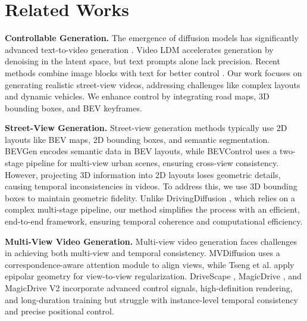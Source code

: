 \section{Related Works}
\label{sec:related}

\noindent \textbf{Controllable Generation.}  
The emergence of diffusion models \cite{zhang2024moonshot} has significantly advanced text-to-video generation \cite{an2023latent, blattmann2023align, guo2023animatediff, he2022latent, ho2022imagen, svd, singer2022make, wang2023videofactory, zhou2023magicvideo, cogvideox, guo2024infinitydrive}. Video LDM \cite{blattmann2023align} accelerates generation by denoising in the latent space, but text prompts alone lack precision. Recent methods combine image blocks with text for better control \cite{zhang2024moonshot}. Our work focuses on generating realistic street-view videos, addressing challenges like complex layouts and dynamic vehicles. We enhance control by integrating road maps, 3D bounding boxes, and BEV keyframes.

\noindent \textbf{Street-View Generation.}  
Street-view generation methods typically use 2D layouts like BEV maps, 2D bounding boxes, and semantic segmentation. BEVGen \cite{swerdlow2023street} encodes semantic data in BEV layouts, while BEVControl \cite{bevcontrol} uses a two-stage pipeline for multi-view urban scenes, ensuring cross-view consistency. However, projecting 3D information into 2D layouts loses geometric details, causing temporal inconsistencies in videos. To address this, we use 3D bounding boxes to maintain geometric fidelity. Unlike DrivingDiffusion \cite{li2023drivingdiffusionlayoutguidedmultiviewdriving}, which relies on a complex multi-stage pipeline, our method simplifies the process with an efficient, end-to-end framework, ensuring temporal coherence and computational efficiency.

\noindent \textbf{Multi-View Video Generation.}  
Multi-view video generation faces challenges in achieving both multi-view and temporal consistency. MVDiffusion \cite{tang2023mvdiffusion} uses a correspondence-aware attention module to align views, while Tseng et al. \cite{poseguideddiffusion} apply epipolar geometry for view-to-view regularization. DriveScape \cite{drivescape}, MagicDrive \cite{gao2023magicdrive}, and MagicDrive V2 \cite{gao2024magicdrivedithighresolutionlongvideo} incorporate advanced control signals, high-definition rendering, and long-duration training but struggle with instance-level temporal consistency and precise positional control.

